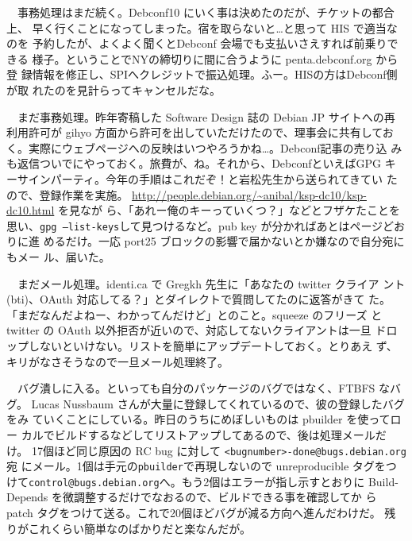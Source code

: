 \documentclass[mingoth,a4paper]{jsarticle}
\begin{document}
　事務処理はまだ続く。Debconf10 にいく事は決めたのだが、チケットの都合上、
 早く行くことになってしまった。宿を取らないと…と思って HIS で適当なのを
 予約したが、よくよく聞くとDebconf 会場でも支払いさえすれば前乗りできる
 様子。ということでNYの締切りに間に合うように penta.debconf.org から登
 録情報を修正し、SPIへクレジットで振込処理。ふー。HISの方はDebconf側が取
 れたのを見計らってキャンセルだな。

　まだ事務処理。昨年寄稿した Software Design 誌の Debian JP サイトへの再
 利用許可が gihyo 方面から許可を出していただけたので、理事会に共有してお
 く。実際にウェブページへの反映はいつやろうかね…。Debconf記事の売り込
 みも返信ついでにやっておく。旅費が、ね。それから、DebconfといえばGPG
 キーサインパーティ。今年の手順はこれだぞ！と岩松先生から送られてきてい
 たので、登録作業を実施。
 \url{http://people.debian.org/~anibal/ksp-dc10/ksp-dc10.html} を見なが
 ら、「あれー俺のキーっていくつ？」などとフザケたことを思い、\texttt{gpg
 --list-keys}して見つけるなど。pub key が分かればあとはページどおりに進
 めるだけ。一応 port25 ブロックの影響で届かないとか嫌なので自分宛にもメー
 ル、届いた。


　まだメール処理。identi.ca で Gregkh 先生に「あなたの twitter クライア
 ント (bti)、OAuth 対応してる？」とダイレクトで質問してたのに返答がきて
 た。「まだなんだよねー、わかってんだけど」とのこと。squeeze のフリーズ
 と twitter の OAuth 以外拒否が近いので、対応してないクライアントは一旦
 ドロップしないといけない。リストを簡単にアップデートしておく。とりあえ
 ず、キリがなさそうなので一旦メール処理終了。


　バグ潰しに入る。といっても自分のパッケージのバグではなく、FTBFS なバグ。
 Lucas Nussbaum さんが大量に登録してくれているので、彼の登録したバグをみ
 ていくことにしている。昨日のうちにめぼしいものは pbuilder を使ってロー
 カルでビルドするなどしてリストアップしてあるので、後は処理メールだけ。
 17個ほど同じ原因の RC bug に対して \texttt{<bugnumber>-done@bugs.debian.org}宛
 にメール。1個は手元の\texttt{pbuilder}で再現しないので unreproducible タグをつ
 けて\texttt{control@bugs.debian.org}へ。もう2個はエラーが指し示すとおりに
 Build-Depends を微調整するだけでなおるので、ビルドできる事を確認してか
 ら patch タグをつけて送る。これで20個ほどバグが減る方向へ進んだわけだ。
 残りがこれくらい簡単なのばかりだと楽なんだが。


\end{document}
